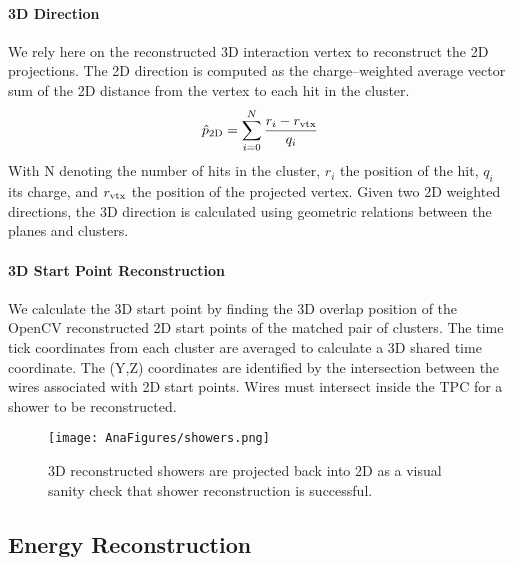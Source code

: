 \documentclass[12pt]{article}
\begin{document}
\paragraph{3D Direction}  We rely here on the reconstructed 3D interaction vertex to reconstruct the 2D projections. The 2D direction is computed as the charge--weighted average vector sum of the 2D distance from the vertex to each hit in the cluster.
\begin{equation}
  \hat{p}_{\rm 2D} = \sum_{i=0}^{N} \frac{ r_i - r_{\rm vtx} } { q_i }
\end{equation}
With N denoting the number of hits in the cluster, $r_i$ the position of the hit, $q_i$ its charge, and $r_{\rm vtx}$ the position of the projected vertex. Given two 2D weighted directions, the 3D direction is calculated using geometric relations between the planes and clusters. 

\paragraph{3D Start Point Reconstruction} We calculate the 3D start point by finding the 3D overlap position of the OpenCV reconstructed 2D start points of the matched pair of clusters. The time tick coordinates from each cluster are averaged to calculate a 3D shared time coordinate. The (Y,Z) coordinates are identified by the intersection between the wires associated with 2D start points.  Wires must intersect inside the TPC for a shower to be reconstructed. 

\begin{figure}[h!] %
\centering
\texttt{[image: AnaFigures/showers.png]}
\caption{3D reconstructed showers are projected back into 2D as a visual sanity check that shower reconstruction is successful.}
\label{fig:showers}
\end{figure}

\subsection{Energy Reconstruction}
\label{sec:ereco}
\end{document}
